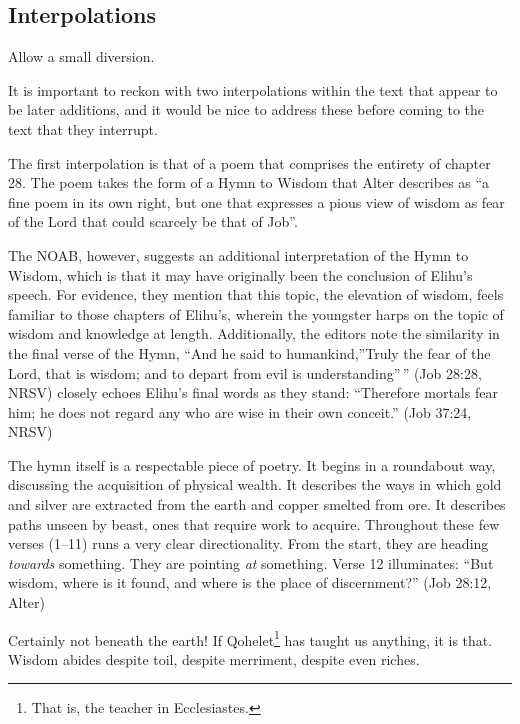 \hypertarget{interpolations}{%
\subsection*{Interpolations}\label{interpolations}}

Allow a small diversion.

It is important to reckon with two interpolations within the text that appear to be later additions, and it would be nice to address these before coming to the text that they interrupt.

The first interpolation is that of a poem that comprises the entirety of chapter 28. The poem takes the form of a Hymn to Wisdom that Alter describes as ``a fine poem in its own right, but one that expresses a pious view of wisdom as fear of the Lord that could scarcely be that of Job''. \parencite[458]{alter}

The NOAB, however, suggests an additional interpretation of the Hymn to Wisdom, which is that it may have originally been the conclusion of Elihu's speech. For evidence, they mention that this topic, the elevation of wisdom, feels familiar to those chapters of Elihu's, wherein the youngster harps on the topic of wisdom and knowledge at length. Additionally, the editors note the similarity in the final verse of the Hymn, ``And he said to humankind,''Truly the fear of the Lord, that is wisdom; and to depart from evil is understanding''\,'' (Job 28:28, NRSV) closely echoes Elihu's final words as they stand: ``Therefore mortals fear him; he does not regard any who are wise in their own conceit.'' (Job 37:24, NRSV)

The hymn itself is a respectable piece of poetry. It begins in a roundabout way, discussing the acquisition of physical wealth. It describes the ways in which gold and silver are extracted from the earth and copper smelted from ore. It describes paths unseen by beast, ones that require work to acquire. Throughout these few verses (1--11) runs a very clear directionality. From the start, they are heading \emph{towards} something. They are pointing \emph{at} something. Verse 12 illuminates: ``But wisdom, where is it found, and where is the place of discernment?'' (Job 28:12, Alter)

Certainly not beneath the earth! If Qohelet\footnote{That is, the teacher in Ecclesiastes.\footnotemark} has taught us anything, it is that. Wisdom abides despite toil, despite merriment, despite even riches.

